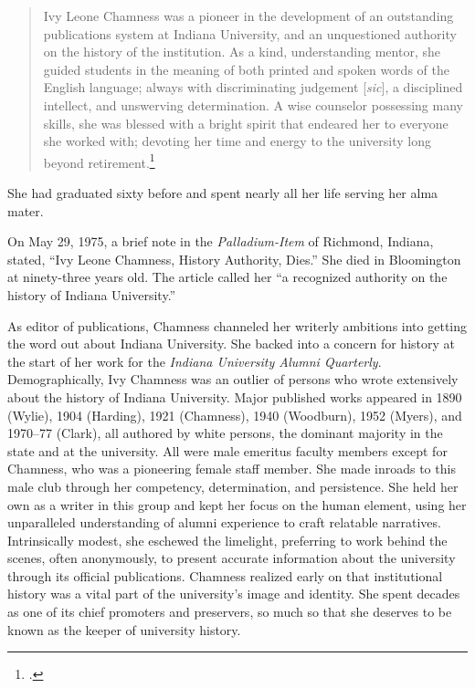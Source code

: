 \documentclass[
  american,
  letterpaper,
]{scrreprt}
\begin{document}
\begin{quote}
Ivy Leone Chamness was a pioneer in the development of an outstanding
publications system at Indiana University, and an unquestioned authority
on the history of the institution. As a kind, understanding mentor, she
guided students in the meaning of both printed and spoken words of the
English language; always with discriminating judgement {[}\emph{sic}{]},
a disciplined intellect, and unswerving determination. A wise counselor
possessing many skills, she was blessed with a bright spirit that
endeared her to everyone she worked with; devoting her time and energy
to the university long beyond retirement.\footnote{.}
\end{quote}

She had graduated sixty before and spent nearly all her life serving her
alma mater.

On May 29, 1975, a brief note in the \emph{Palladium-Item} of Richmond,
Indiana, stated, ``Ivy Leone Chamness, History Authority, Dies.'' She
died in Bloomington at ninety-three years old. The article called her
``a recognized authority on the history of Indiana University.''

As editor of publications, Chamness channeled her writerly ambitions
into getting the word out about Indiana University. She backed into a
concern for history at the start of her work for the \emph{Indiana
University Alumni Quarterly}. Demographically, Ivy Chamness was an
outlier of persons who wrote extensively about the history of Indiana
University. Major published works appeared in 1890 (Wylie), 1904
(Harding), 1921 (Chamness), 1940 (Woodburn), 1952 (Myers), and 1970--77
(Clark), all authored by white persons, the dominant majority in the
state and at the university. All were male emeritus faculty members
except for Chamness, who was a pioneering female staff member. She made
inroads to this male club through her competency, determination, and
persistence. She held her own as a writer in this group and kept her
focus on the human element, using her unparalleled understanding of
alumni experience to craft relatable narratives. Intrinsically modest,
she eschewed the limelight, preferring to work behind the scenes, often
anonymously, to present accurate information about the university
through its official publications. Chamness realized early on that
institutional history was a vital part of the university's image and
identity. She spent decades as one of its chief promoters and
preservers, so much so that she deserves to be known as the keeper of
university history.
\end{document}
